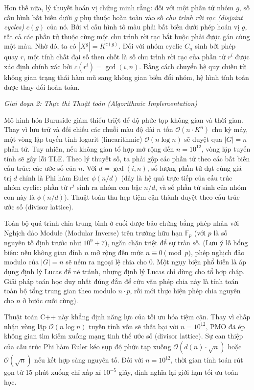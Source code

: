 \documentclass{article}
\begin{document}
Hơn thế nữa, lý thuyết hoán vị chứng minh rằng: đối với một phần tử nhóm $g$, số cấu hình bất biến dưới $g$ phụ thuộc hoàn toàn vào số \textit{chu trình rời rạc (disjoint cycles)} $c(g)$ của nó. Bởi vì cấu hình tô màu phải bất biến dưới phép hoán vị $g$, tất cả các phần tử thuộc cùng một chu trình rời rạc bắt buộc phải được gán cùng một màu. Nhờ đó, ta có $|X^g| = K^{c(g)}$. Đối với nhóm cyclic $C_n$ sinh bởi phép quay $r$, một tính chất đại số then chốt là số chu trình rời rạc của phần tử $r^i$ được xác định chính xác bởi $c(r^i) = \gcd(i, n)$. Bằng cách chuyển hệ quy chiếu từ không gian trạng thái hàm mũ sang không gian biến đổi nhóm, hệ hình tính toán được thay đổi hoàn toàn.

\vspace{0.5em}\noindent\emph{Giai đoạn 2: Thực thi Thuật toán (Algorithmic Implementation)}

Mô hình hóa Burnside giảm thiểu triệt để độ phức tạp không gian và thời gian. Thay vì lưu trữ và đối chiếu các chuỗi màu độ dài $n$ tốn $\mathcal{O}(n \cdot K^n)$ chu kỳ máy, một vòng lặp tuyến tính logarit (linearithmic) $\mathcal{O}(n \log n)$ sẽ duyệt qua $|G| = n$ phần tử. Tuy nhiên, nếu không gian tổ hợp mở rộng đến $n = 10^{12}$, vòng lặp tuyến tính sẽ gây lỗi TLE. Theo lý thuyết số, ta phải gộp các phần tử theo các bất biến cấu trúc: các ước số của $n$. Với $d = \gcd(i, n)$, số lượng phần tử đạt cùng giá trị $d$ chính là Phi hàm Euler $\phi(n/d)$ (đây là hệ quả trực tiếp của cấu trúc nhóm cyclic: phần tử $r^i$ sinh ra nhóm con bậc $n/d$, và số phần tử sinh của nhóm con này là $\phi(n/d)$). Thuật toán thu hẹp tiệm cận thành duyệt theo cấu trúc ước số (divisor lattice).

Toàn bộ quá trình chia trung bình ở cuối được bảo chứng bằng phép nhân với Nghịch đảo Module (Modular Inverse) trên trường hữu hạn $\mathbb{F}_p$ (với $p$ là số nguyên tố định trước như $10^9+7$), ngăn chặn triệt để sự tràn số. (Lưu ý lỗ hổng biên: nếu không gian đỉnh $n$ mở rộng đến mức $n \equiv 0 \pmod p$, phép nghịch đảo modulo của $|G|=n$ sẽ ném ra ngoại lệ chia cho 0. Một ngụy biện phổ biến là áp dụng định lý Lucas để né tránh, nhưng định lý Lucas chỉ dùng cho tổ hợp chập. Giải pháp toán học duy nhất đúng đắn để cứu vãn phép chia này là tính toán toàn bộ tổng trung gian theo modulo $n \cdot p$, rồi mới thực hiện phép chia nguyên cho $n$ ở bước cuối cùng).

Thuật toán C++ này khẳng định năng lực của tối ưu hóa tiệm cận. Thay vì chấp nhận vòng lặp $\mathcal{O}(n \log n)$ tuyến tính vốn sẽ thất bại với $n=10^{12}$, PMO đã ép không gian tìm kiếm xuống mạng tinh thể ước số (divisor lattice). Sự can thiệp của cấu trúc Phi hàm Euler kéo sụp độ phức tạp xuống $\mathcal{O}(d(n) \cdot \sqrt{n})$ hoặc $\mathcal{O}(\sqrt{n})$ nếu kết hợp sàng nguyên tố. Đối với $n=10^{12}$, thời gian tính toán rút gọn từ 15 phút xuống chỉ xấp xỉ $10^{-5}$ giây, định nghĩa lại giới hạn tối ưu toán học.
\end{document}
